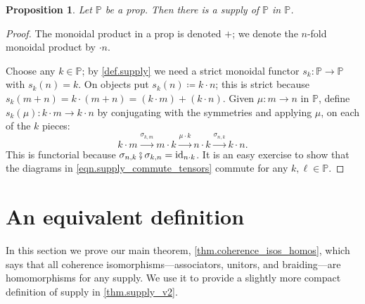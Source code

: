 \documentclass[11pt, oneside, article]{memoir}
\theoremstyle{plain}
\newtheorem{proposition}[theorem]{Proposition}
\theoremstyle{definition}
\theoremstyle{remark}
\DeclareMathOperator{\id}{id}
\newcommand{\pp}{\mathbb{P}}
\newcommand{\cp}{\mathbin{\fatsemi}}
\newcommand{\To}[1]{\xrightarrow{#1}}
\begin{document}
\begin{proposition}\label{prop.p_supplies_itself}
Let $\pp$ be a prop. Then there is a supply of $\pp$ in $\pp$.
\end{proposition}
\begin{proof}
The monoidal product in a prop is denoted $+$; we denote the $n$-fold monoidal product by $\cdot n$.

Choose any $k\in\pp$; by \cref{def.supply} we need a strict monoidal functor $s_k\colon\pp\to\pp$ with $s_k(n)=k$. On objects put $s_k(n)\coloneqq k\cdot n$; this is strict because $s_k(m+n)=k\cdot(m+n)=(k\cdot m)+(k\cdot n)$. Given $\mu\colon m\to n$ in $\pp$, define $s_k(\mu)\colon k\cdot m\to k\cdot n$ by conjugating with the symmetries and applying $\mu$, on each of the $k$ pieces:
\begin{equation}\label{eqn.conjugation}
	k\cdot m\To{\sigma_{k,m}}
	m\cdot k\To{\mu\cdot k}
	n\cdot k\To{\sigma_{n,k}}
	k\cdot n.
\end{equation}
This is functorial because $\sigma_{n,k}\cp\sigma_{k,n}=\id_{n\cdot k}$. It is an easy exercise to show that the diagrams in \cref{eqn.supply_commute_tensors} commute for any $k,\ell\in\pp$.
\end{proof}
\section{An equivalent definition}\label{sec.main_thm}

In this section we prove our main theorem, \cref{thm.coherence_isos_homos}, which says that all coherence isomorphisms---associators, unitors, and braiding---are homomorphisms for any supply. We use it to provide a slightly more compact definition of supply in \cref{thm.supply_v2}.
\end{document}
